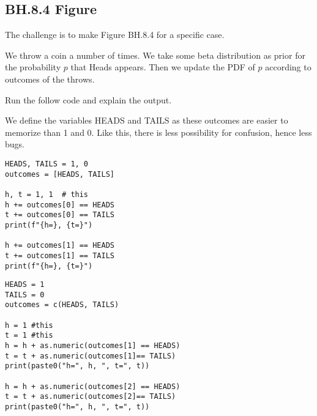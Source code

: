 

\subsection{BH.8.4 Figure}
The challenge is to make Figure BH.8.4 for a specific case.

We throw a coin a number of times. We take some beta distribution as prior for the probability $p$ that Heads appears. Then we update the PDF of $p$ according to outcomes of the throws.

\begin{exercise}
Run the follow code and explain the output.

We define the variables HEADS and TAILS as these outcomes are easier to memorize than 1 and 0. Like this, there is less possibility for confusion, hence less bugs.

\begin{verbatim}
HEADS, TAILS = 1, 0
outcomes = [HEADS, TAILS]

h, t = 1, 1  # this
h += outcomes[0] == HEADS
t += outcomes[0] == TAILS
print(f"{h=}, {t=}")

h += outcomes[1] == HEADS
t += outcomes[1] == TAILS
print(f"{h=}, {t=}")
\end{verbatim}

\begin{verbatim}
HEADS = 1
TAILS = 0
outcomes = c(HEADS, TAILS)

h = 1 #this
t = 1 #this
h = h + as.numeric(outcomes[1] == HEADS)
t = t + as.numeric(outcomes[1]== TAILS)
print(paste0("h=", h, ", t=", t))

h = h + as.numeric(outcomes[2] == HEADS)
t = t + as.numeric(outcomes[2]== TAILS)
print(paste0("h=", h, ", t=", t))
\end{verbatim}

\end{exercise}


